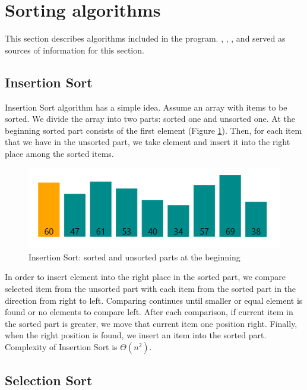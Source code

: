 \documentclass[
  field=inf,
  biblatex,
  language=english,
  glossaries,
  theorems=false,
  sourcecodes=false,
  index
]{kidiplom}
\begin{document}
\newpage
\section{Sorting algorithms}

This section describes algorithms included in the program. \cite{cormen}, \citep{alm2}, \cite{knuth3}, \cite{sedgewik} and \cite{geeks} served as sources of information for this section.

\subsection{Insertion Sort}
\label{sec:insertion}
Insertion Sort algorithm has a simple idea. Assume an array with items to be sorted. We divide the array into two parts: sorted one and unsorted one. At the beginning sorted part consists of the first element (Figure \ref{fig:insert}). Then, for each item that we have in the unsorted part, we take element and insert it into the right place among the sorted items.

\begin{figure}[H]
\begin{center}
	
	\includegraphics[scale=0.7]{img/Insertion.png}
	\caption{Insertion Sort: sorted and unsorted parts at the beginning}\label{fig:insert}
\end{center}
\end{figure}

In order to insert element into the right place in the sorted part, we compare selected item from the unsorted part with each item from the sorted part in the direction from right to left. Comparing continues until smaller or equal element is found or no elements to compare left. After each comparison, if current item in the sorted part is greater, we move that current item one position right. Finally, when the right position is found, we insert an item into the sorted part. Complexity of Insertion Sort is $\Theta(n^2)$.

\subsection{Selection Sort}
\label{sec:selection}
\end{document}
